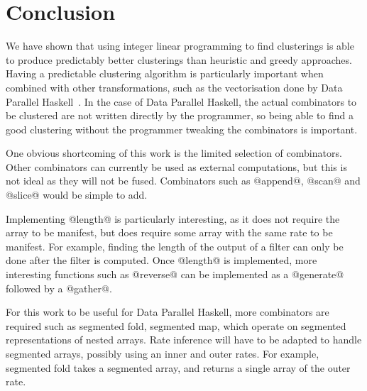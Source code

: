 \section{Conclusion}

We have shown that using integer linear programming to find clusterings is able to produce predictably better clusterings than heuristic and greedy approaches.
Having a predictable clustering algorithm is particularly important when combined with other transformations, such as the vectorisation done by Data Parallel Haskell~\cite{chakravarty2007data}.
In the case of Data Parallel Haskell, the actual combinators to be clustered are not written directly by the programmer, so being able to find a good clustering without the programmer tweaking the combinators is important.

One obvious shortcoming of this work is the limited selection of combinators.
Other combinators can currently be used as external computations, but this is not ideal as they will not be fused.
Combinators such as @append@, @scan@ and @slice@ would be simple to add.

Implementing @length@ is particularly interesting, as it does not require the array to be manifest, but does require some array with the same rate to be manifest.
For example, finding the length of the output of a filter can only be done after the filter is computed.
Once @length@ is implemented, more interesting functions such as @reverse@ can be implemented as a @generate@ followed by a @gather@.

For this work to be useful for Data Parallel Haskell, more combinators are required such as segmented fold, segmented map, which operate on segmented representations of nested arrays.
Rate inference will have to be adapted to handle segmented arrays, possibly using an inner and outer rates.
For example, segmented fold takes a segmented array, and returns a single array of the outer rate.

